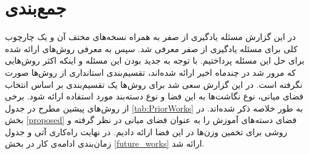 \section{جمع‌بندی}\label{conclusion}
در این گزارش مسئله یادگیری از صفر به همراه نسخه‌های مختف آن و یک چارچوب کلی برای مسئله یادگیری از صفر معرفی شد. سپس به معرفی روش‌های ارائه شده برای حل این مسئله پرداختیم. با توجه به جدید بودن این مسئله و اینکه اکثر روش‌هایی که مرور شد در چندماه اخیر ارائه شده‌اند، تقسیم‌بندی استانداری از روش‌ها صورت نگرفته است. در این گزارش سعی شد برای روش‌ها یک تقسیم‌بندی بر اساس انتخاب فضای میانی، نوع نگاشت‌ها به این فضا و نوع دسته‌بند مورد استفاده ارائه شود. برخی از روش‌های پیشین مطرح در جدول  \ref{tab:PriorWorks} به طور خلاصه ذکر شده‌اند. در بخش \ref{proposed} فضای دسته‌های آموزش را به عنوان فضای میانی در نظر گرفته و روشی برای تخمین وزن‌ها در این فضا ارائه دادیم. در نهایت راه‌کاری آتی و جدول زمان‌بندی ادامه‌ی کار در بخش \ref{future_works} ارائه شد.

